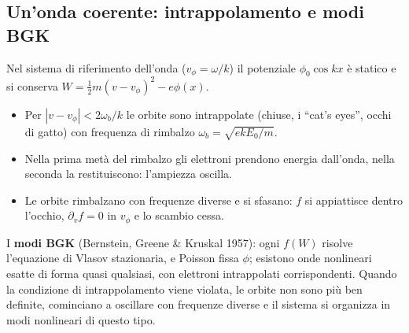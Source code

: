 \subsection{Un'onda coerente: intrappolamento e modi BGK}
Nel sistema di riferimento dell'onda ($v_\phi=\omega/k$) il potenziale $\phi_0\cos kx$ è statico e si conserva $W=\frac12m(v-v_\phi)^2-e\phi(x)$.
\begin{itemize}
\item Per $|v-v_\phi|<2\omega_b/k$ le orbite sono intrappolate (chiuse, i ``cat's eyes'', occhi di gatto) con frequenza di rimbalzo $\omega_b=\sqrt{ekE_0/m}$.
\item Nella prima metà del rimbalzo gli elettroni prendono energia dall'onda, nella seconda la restituiscono: l'ampiezza oscilla.
\item Le orbite rimbalzano con frequenze diverse e si sfasano: $f$ si appiattisce dentro l'occhio, $\partial_vf=0$ in $v_\phi$ e lo scambio cessa.
\end{itemize}
I \textbf{modi BGK} (Bernstein, Greene \& Kruskal 1957): ogni $f(W)$ risolve l'equazione di Vlasov stazionaria, e Poisson fissa $\phi$; esistono onde nonlineari esatte di forma quasi qualsiasi, con elettroni intrappolati corrispondenti. Quando la condizione di intrappolamento viene violata, le orbite non sono più ben definite, cominciano a oscillare con frequenze diverse e il sistema si organizza in modi nonlineari di questo tipo.

